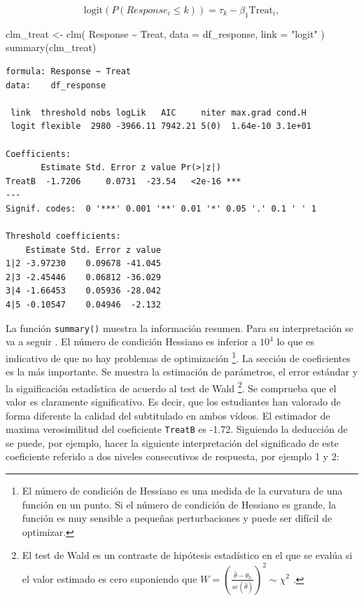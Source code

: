 \documentclass[
  12pt,
  a4paper,
  extrafontsizes,
  onecolumn,
  openright,
  table]{memoir}
\newenvironment{Shaded}{\begin{snugshade}}{\end{snugshade}}
\newcommand{\AttributeTok}[1]{\textcolor[rgb]{0.40,0.45,0.13}{#1}}
\newcommand{\FunctionTok}[1]{\textcolor[rgb]{0.28,0.35,0.67}{#1}}
\newcommand{\NormalTok}[1]{\textcolor[rgb]{0.00,0.23,0.31}{#1}}
\newcommand{\OtherTok}[1]{\textcolor[rgb]{0.00,0.23,0.31}{#1}}
\newcommand{\SpecialCharTok}[1]{\textcolor[rgb]{0.37,0.37,0.37}{#1}}
\newcommand{\StringTok}[1]{\textcolor[rgb]{0.13,0.47,0.30}{#1}}
\begin{document}
\[
\text{logit}(P(Response_i \leq k)) = \tau_k - \beta_1 \text{Treat}_i,
\]

\scriptsize

\begin{Shaded}
\begin{Highlighting}[]
\NormalTok{clm\_treat }\OtherTok{\textless{}{-}}
    \FunctionTok{clm}\NormalTok{(}
\NormalTok{        Response }\SpecialCharTok{\textasciitilde{}}\NormalTok{ Treat,}
        \AttributeTok{data =}\NormalTok{ df\_response, }\AttributeTok{link =} \StringTok{"logit"}
\NormalTok{    )}
\FunctionTok{summary}\NormalTok{(clm\_treat)}
\end{Highlighting}
\end{Shaded}

\begin{verbatim}
formula: Response ~ Treat
data:    df_response

 link  threshold nobs logLik   AIC     niter max.grad cond.H 
 logit flexible  2980 -3966.11 7942.21 5(0)  1.64e-10 3.1e+01

Coefficients:
       Estimate Std. Error z value Pr(>|z|)    
TreatB  -1.7206     0.0731  -23.54   <2e-16 ***
---
Signif. codes:  0 '***' 0.001 '**' 0.01 '*' 0.05 '.' 0.1 ' ' 1

Threshold coefficients:
    Estimate Std. Error z value
1|2 -3.97230    0.09678 -41.045
2|3 -2.45446    0.06812 -36.029
3|4 -1.66453    0.05936 -28.042
4|5 -0.10547    0.04946  -2.132
\end{verbatim}

\normalsize

La función \texttt{summary()} muestra la información resumen. Para su
interpretación se va a seguir \textcite{christensen2018CumulativeLM}. El
número de condición Hessiano es inferior a \(10^4\) lo que es indicativo
de que no hay problemas de optimización \footnote{El número de condición
  de Hessiano es una medida de la curvatura de una función en un punto.
  Si el número de condición de Hessiano es grande, la función es muy
  sensible a pequeñas perturbaciones y puede ser difícil de optimizar.}.
La sección de coeficientes es la más importante. Se muestra la
estimación de parámetros, el error estándar y la significación
estadística de acuerdo al test de Wald \footnote{El test de Wald es un
  contraste de hipótesis estadístico en el que se evalúa si el valor
  estimado es cero suponiendo que
  \(W = \left(\frac{\hat{\theta} - \theta_0}{se(\hat{\theta})}\right)^2 \sim \chi^{2}\)
  .}. Se comprueba que el valor es claramente significativo. Es decir,
que los estudiantes han valorado de forma diferente la calidad del
subtitulado en ambos vídeos. El estimador de maxima verosimilitud del
coeficiente \texttt{TreatB} es -1.72. Siguiendo la deducción de
\textcite{bruin2011} se puede, por ejemplo, hacer la siguiente
interpretación del significado de este coeficiente referido a dos
niveles consecutivos de respuesta, por ejemplo 1 y 2:
\end{document}
